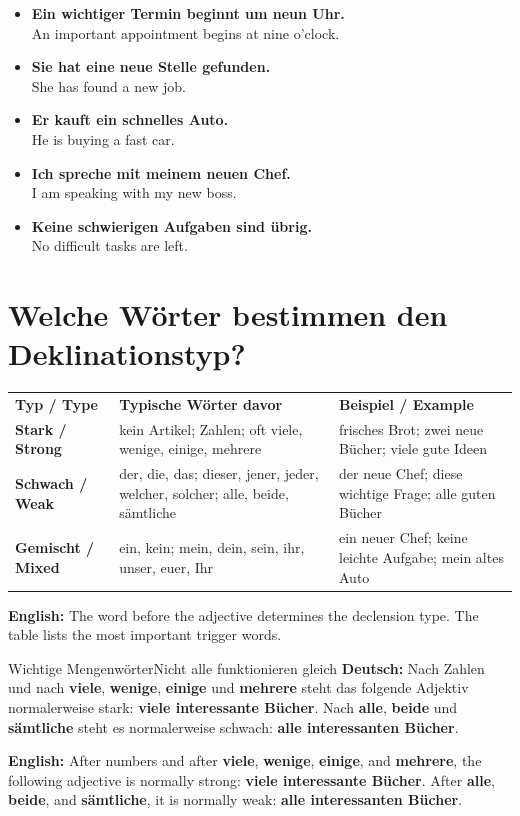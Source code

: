 \documentclass[a4paper,11pt]{article}
\newcommand{\GermanText}[1]{\textbf{Deutsch: }#1\par}
\newcommand{\EnglishText}[1]{{\small\color{SoftGray}\textbf{English: }#1\par}}
\newcommand{\ExampleItem}[2]{\item \textbf{#1}\\{\small\color{SoftGray}#2}}
\newcommand{\TableEnglish}[1]{{\small\color{SoftGray}\textbf{English: }#1\par}}
\begin{document}
        \begin{exbox}
            \begin{itemize}
                \ExampleItem{Ein wichtiger Termin beginnt um neun Uhr.}{An important appointment begins at nine o'clock.}
                \ExampleItem{Sie hat eine neue Stelle gefunden.}{She has found a new job.}
                \ExampleItem{Er kauft ein schnelles Auto.}{He is buying a fast car.}
                \ExampleItem{Ich spreche mit meinem neuen Chef.}{I am speaking with my new boss.}
                \ExampleItem{Keine schwierigen Aufgaben sind übrig.}{No difficult tasks are left.}
            \end{itemize}
        \end{exbox}

    \section{Welche Wörter bestimmen den Deklinationstyp?}

        \begin{longtable}{>{\bfseries}p{3.1cm}|p{5.5cm}|p{6.1cm}}
            \rowcolor{HeaderBlueDark}
            \color{white}\textbf{Typ / Type} &
            \color{white}\textbf{Typische Wörter davor} &
            \color{white}\textbf{Beispiel / Example} \\
            Stark / Strong & kein Artikel; Zahlen; oft viele, wenige, einige, mehrere & frisches Brot; zwei neue Bücher; viele gute Ideen \\
            Schwach / Weak & der, die, das; dieser, jener, jeder, welcher, solcher; alle, beide, sämtliche & der neue Chef; diese wichtige Frage; alle guten Bücher \\
            Gemischt / Mixed & ein, kein; mein, dein, sein, ihr, unser, euer, Ihr & ein neuer Chef; keine leichte Aufgabe; mein altes Auto \\
        \end{longtable}
        \TableEnglish{The word before the adjective determines the declension type. The table lists the most important trigger words.}

        \begin{grammarentry}{Wichtige Mengenwörter}{Nicht alle funktionieren gleich}
            \GermanText{Nach Zahlen und nach \textbf{viele}, \textbf{wenige}, \textbf{einige} und \textbf{mehrere} steht das folgende Adjektiv normalerweise stark: \textbf{viele interessante Bücher}. Nach \textbf{alle}, \textbf{beide} und \textbf{sämtliche} steht es normalerweise schwach: \textbf{alle interessanten Bücher}.}
            \EnglishText{After numbers and after \textbf{viele}, \textbf{wenige}, \textbf{einige}, and \textbf{mehrere}, the following adjective is normally strong: \textbf{viele interessante Bücher}. After \textbf{alle}, \textbf{beide}, and \textbf{sämtliche}, it is normally weak: \textbf{alle interessanten Bücher}.}
        \end{grammarentry}
\end{document}
